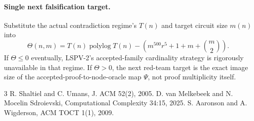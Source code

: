 \documentclass[11pt]{article}
\begin{document}
\paragraph{Single next falsification target.}
Substitute the actual contradiction regime's $T(n)$ and target circuit size $m(n)$ into
\[
\Theta(n,m)
=
T(n)\operatorname{polylog}T(n)
-
\left(
m^{500}r^5+1+m+\binom m2
\right).
\]
If $\Theta\le0$ eventually, LSPV-2's accepted-family cardinality strategy is rigorously unavailable in that regime. If $\Theta>0$, the next red-team target is the exact image size of the accepted-proof-to-node-oracle map $\Psi$, not proof multiplicity itself.

\begin{thebibliography}{3}
 R. Shaltiel and C. Umans, J. ACM 52(2), 2005.
 D. van Melkebeek and N. Mocelin Sdroievski, Computational Complexity 34:15, 2025.
 S. Aaronson and A. Wigderson, ACM TOCT 1(1), 2009.
\end{thebibliography}
\end{document}
